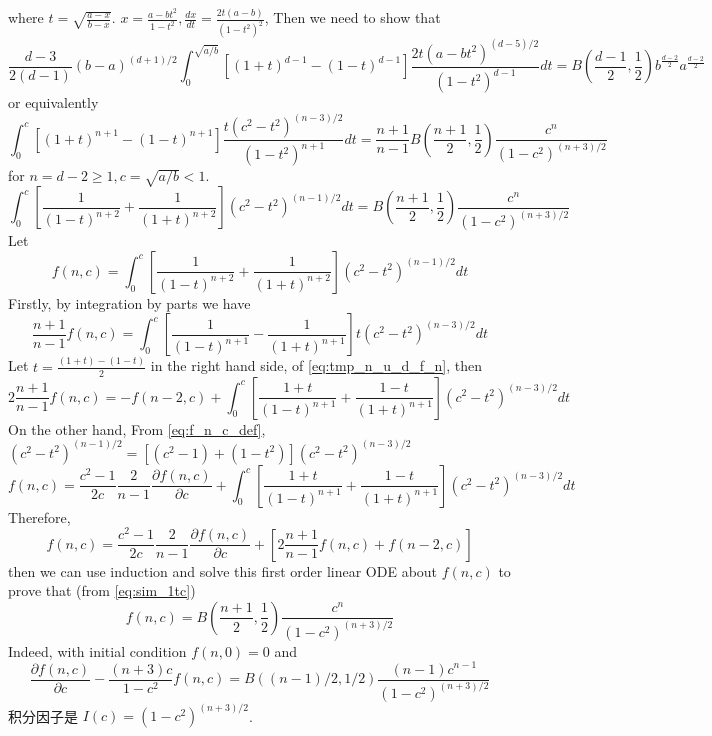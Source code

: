 \documentclass{article}
\begin{document}
where $t=\sqrt{\frac{a-x}{b-x}}$.
$x=\frac{a-bt^2}{1-t^2},\frac{dx}{dt} = \frac{2t(a-b)}{(1-t^2)^2}$,
Then we need to show that
\begin{equation*}
\frac{d-3}{2(d-1)} (b-a)^{(d+1)/2}\int_0^{\sqrt{a/b}} [(1+t)^{d-1}-(1-t)^{d-1}] \frac{2t(a-bt^2)^{(d-5)/2}}{(1-t^2)^{d-1}}dt
= B(\frac{d-1}{2}, \frac{1}{2})
b^{\frac{d-2}{2}}
a^{\frac{d-2}{2}}
\end{equation*}
or equivalently
\begin{equation*}
    \int_0^{c}
    [(1+t)^{n+1}-(1-t)^{n+1}]
    \frac{t(c^2- t^2)^{(n-3)/2}}{(1-t^2)^{n+1}}dt
    = \frac{n+1}{n-1}B(\frac{n+1}{2}, \frac{1}{2})
    \frac{c^n}{(1-c^2)^{(n+3)/2}}
    \end{equation*}
for $n=d-2\geq 1, c=\sqrt{a/b}<1$.    
\begin{equation}
    \int_0^{c}
    [\frac{1}{(1-t)^{n+2}}+\frac{1}{(1+t)^{n+2}}]
    (c^2- t^2)^{(n-1)/2}dt
    =B(\frac{n+1}{2}, \frac{1}{2})
    \frac{c^n}{(1-c^2)^{(n+3)/2}}
    \end{equation}
Let
\begin{equation}\label{eq:f_n_c_def}
 f(n,c)=   \int_0^{c}
    [\frac{1}{(1-t)^{n+2}}+\frac{1}{(1+t)^{n+2}}]
    (c^2- t^2)^{(n-1)/2}dt
\end{equation}
Firstly, by integration by parts 
we have 
\begin{equation}\label{eq:tmp_n_u_d_f_n}
    \frac{n+1}{n-1}f(n,c)
    =\int_0^{c}
    \left[\frac{1}{(1-t)^{n+1}}
    -\frac{1}{(1+t)^{n+1}}
    \right]
    t(c^2- t^2)^{(n-3)/2}
    dt
\end{equation}
Let $t=\frac{(1+t)-(1-t)}{2}$ in the right hand side,
of \eqref{eq:tmp_n_u_d_f_n}, then
\begin{equation}
    2\frac{n+1}{n-1}f(n,c)
=    -f(n-2,c)  
+ \int_0^{c}
\left[\frac{1+t}{(1-t)^{n+1}}
+\frac{1-t}{(1+t)^{n+1}}
\right]
(c^2- t^2)^{(n-3)/2}
dt
\end{equation}
On the other hand,
From \eqref{eq:f_n_c_def},
$(c^2-t^2)^{(n-1)/2}
=[(c^2-1)+(1-t^2)](c^2-t^2)^{(n-3)/2}$
\begin{equation}
    f(n, c) = \frac{c^2-1}{2c}\frac{2}{n-1}\frac{\partial f(n,c)}{\partial c}
    +  \int_0^{c}
    \left[\frac{1+t}{(1-t)^{n+1}}
    +\frac{1-t}{(1+t)^{n+1}}
    \right]
    (c^2- t^2)^{(n-3)/2}
    dt
\end{equation}
Therefore,
\begin{equation}\label{eq:sim_1tc}
    f(n,c)=\frac{c^2-1}{2c}\frac{2}{n-1}\frac{\partial f(n,c)}{\partial c}
    + [2\frac{n+1}{n-1} f(n,c) + f(n-2, c)]
\end{equation}
then we can use induction and solve this
first order linear ODE about $f(n,c)$ to prove
that (from \eqref{eq:sim_1tc})
\begin{equation}
    f(n,c)= B(\frac{n+1}{2}, \frac{1}{2})
    \frac{c^n}{(1-c^2)^{(n+3)/2}}
\end{equation}
Indeed, with initial condition $f(n,0)=0$ and
\begin{equation}
    \frac{\partial f(n,c)}{\partial c}
    - \frac{(n+3)c}{1-c^2} f(n,c)
    = B((n-1)/2, 1/2)\frac{(n-1)c^{n-1}}{(1-c^2)^{(n+3)/2}}
\end{equation}
积分因子是 $I(c)=(1-c^2)^{(n+3)/2}$.
\end{document}
